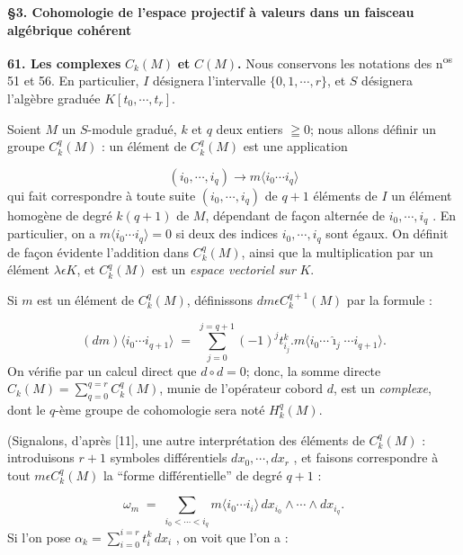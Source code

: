 \textbf{§3. Cohomologie de l'espace projectif à valeurs dans un faisceau algébrique cohérent}

\textbf{61. Les complexes} $C_k(M)$ \textbf{et} $C(M)$\textbf{.} Nous conservons les notations des n\textsuperscript{os} 51 et 56. En particulier, $I$ désignera l'intervalle $\{0, 1, \cdots , r\}$, et $S$ désignera l'algèbre graduée $K[t_0 , \cdots , t_r]$.

Soient $M$ un $S$-module gradué, $k$ et $q$ deux entiers $\geqq 0$; nous allons définir un groupe $C^q_k(M)$ : un élément de $C^q_k(M)$ est une application

\begin{equation*}
(i_0 , \cdots , i_q) \to m\langle i_0 \cdots i_q \rangle
\end{equation*}
qui fait correspondre à toute suite $(i_0 , \cdots , i_q)$ de $q + 1$ éléments de $I$ un élément homogène de degré $k(q + 1)$ de $M$, dépendant de façon alternée de $i_0 , \cdots , i_q$ . En particulier, on a $m\langle i_0 \cdots i_q \rangle = 0$ si deux des indices $i_0 , \cdots , i_q$ sont égaux. On définit de façon évidente l'addition dans $C^q_k(M)$, ainsi que la multiplication par un élément $\lambda \epsilon K$, et $C^q_k(M)$ est un \textit{espace vectoriel sur} $K$.

Si $m$ est un élément de $C^q_k(M)$, définissons $dm \epsilon C^{q+1}_k(M)$ par la formule :

\begin{equation*}
(dm)\langle i_0 \cdots i_{q+1} \rangle \;=\; \sum_{j=0}^{j=q+1} (-1)^j t^k_{i_j}.m\langle i_0 \cdots \hat{\imath}_j \cdots i_{q+1} \rangle.
\end{equation*}
On vérifie par un calcul direct que $d \circ d = 0$; donc, la somme directe $C_k(M) = \sum_{q=0}^{q=r} C^q_k(M)$, munie de l'opérateur cobord $d$, est un \textit{complexe}, dont le $q$-ème groupe de cohomologie sera noté $H^q_k(M)$.

(Signalons, d'après [11], une autre interprétation des éléments de $C^q_k(M)$ : introduisons $r + 1$ symboles différentiels $dx_0 , \cdots , dx_r$ , et faisons correspondre à tout $m \epsilon C^q_k(M)$ la ``forme différentielle'' de degré $q + 1$ :

\begin{equation*}
\omega_m \;=\; \sum_{i_0<\cdots<i_q} m\langle i_0 \cdots i_i \rangle \, dx_{i_0} \wedge \cdots \wedge dx_{i_q} .
\end{equation*}
Si l'on pose $\alpha_k = \sum_{i=0}^{i=r} t^k_i \, dx_i$ , on voit que l'on a :

